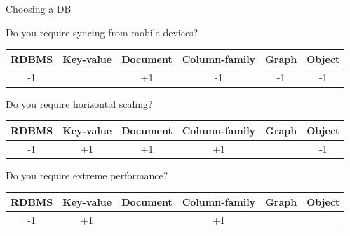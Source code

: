 \documentclass{beamer}
\begin{document}
\begin{frame}{Choosing a DB}

Do you require syncing from mobile devices?

{\small
\begin{center}
\begin{tabular}{c|c|c|c|c|c}
RDBMS & Key-value & Document & Column-family & Graph & Object \\
\hline
-1 &  & +1 & -1 & -1 & -1 \\
\end{tabular}
\end{center}
}

Do you require horizontal scaling?

{\small
\begin{center}
\begin{tabular}{c|c|c|c|c|c}
RDBMS & Key-value & Document & Column-family & Graph & Object \\
\hline
-1 & +1 & +1 & +1 & & -1 \\
\end{tabular}
\end{center}
}

Do you require extreme performance?

{\small
\begin{center}
\begin{tabular}{c|c|c|c|c|c}
RDBMS & Key-value & Document & Column-family & Graph & Object \\
\hline
-1 & +1 &  & +1 & &  \\
\end{tabular}
\end{center}
}

\end{frame}
\end{document}
